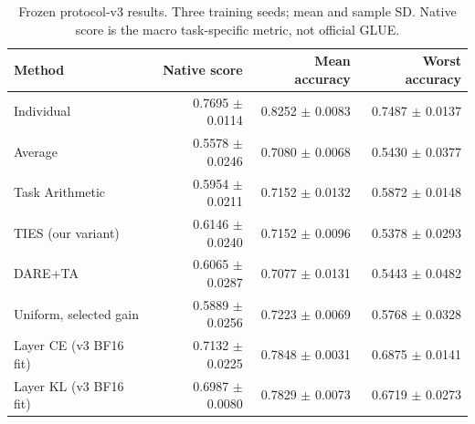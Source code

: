 \begin{table}[H]\centering\small
\caption{Frozen protocol-v3 results. Three training seeds; mean and sample SD. Native score is the macro task-specific metric, not official GLUE.}
\begin{tabular}{lrrr}\toprule
Method & Native score & Mean accuracy & Worst accuracy\\\midrule
Individual & 0.7695 $\pm$ 0.0114 & 0.8252 $\pm$ 0.0083 & 0.7487 $\pm$ 0.0137\\
Average & 0.5578 $\pm$ 0.0246 & 0.7080 $\pm$ 0.0068 & 0.5430 $\pm$ 0.0377\\
Task Arithmetic & 0.5954 $\pm$ 0.0211 & 0.7152 $\pm$ 0.0132 & 0.5872 $\pm$ 0.0148\\
TIES (our variant) & 0.6146 $\pm$ 0.0240 & 0.7152 $\pm$ 0.0096 & 0.5378 $\pm$ 0.0293\\
DARE+TA & 0.6065 $\pm$ 0.0287 & 0.7077 $\pm$ 0.0131 & 0.5443 $\pm$ 0.0482\\
Uniform, selected gain & 0.5889 $\pm$ 0.0256 & 0.7223 $\pm$ 0.0069 & 0.5768 $\pm$ 0.0328\\
Layer CE (v3 BF16 fit) & 0.7132 $\pm$ 0.0225 & 0.7848 $\pm$ 0.0031 & 0.6875 $\pm$ 0.0141\\
Layer KL (v3 BF16 fit) & 0.6987 $\pm$ 0.0080 & 0.7829 $\pm$ 0.0073 & 0.6719 $\pm$ 0.0273\\
\bottomrule\end{tabular}\end{table}
